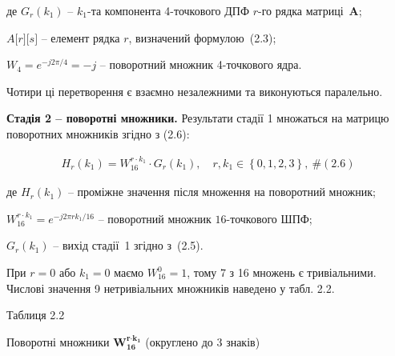\documentclass[
]{article}
\begin{document}
де \(G_{r}(k_{1})\) -- \(k_{1}\)-та компонента 4-точкового ДПФ \(r\)-го
рядка матриці~\(\mathbf{A}\);

\(A\lbrack r\rbrack\lbrack s\rbrack\) -- елемент рядка \(r\), визначений
формулою~(2.3);

\(W_{4} = e^{- j2\pi/4} = - j\) -- поворотний множник 4-точкового ядра.

Чотири ці перетворення є взаємно незалежними та виконуються паралельно.

\textbf{Стадія 2 -- поворотні множники.} Результати стадії 1 множаться
на матрицю поворотних множників згідно з (2.6):

\[\begin{array}{r}
H_{r}\left( k_{1} \right) = W_{16}^{r \cdot k_{1}} \cdot G_{r}\left( k_{1} \right),\quad r,k_{1} \in \left\{ 0,1,2,3 \right\},\ \#(2.6)
\end{array}\]

де \(H_{r}(k_{1})\) -- проміжне значення після множення на поворотний
множник;

\(W_{16}^{r \cdot k_{1}} = e^{- j2\pi rk_{1}/16}\) -- поворотний множник
\(16\)-точкового ШПФ;

\(G_{r}(k_{1})\) -- вихід стадії~1 згідно з~(2.5).

При \(r = 0\) або \(k_{1} = 0\) маємо \(W_{16}^{0} = 1\), тому 7 з 16
множень є тривіальними. Числові значення 9 нетривіальних множників
наведено у табл. 2.2.

Таблиця 2.2

Поворотні множники
\(\mathbf{W}_{\mathbf{16}}^{\mathbf{r}\mathbf{\cdot}\mathbf{k}_{\mathbf{1}}}\)
(округлено до 3 знаків)
\end{document}
